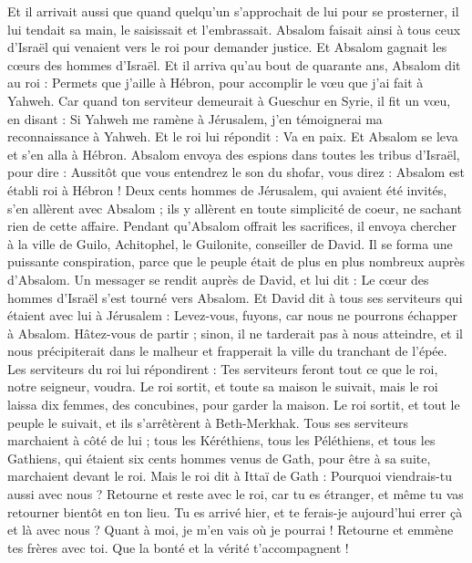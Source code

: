 \begin{multicols}{2}
Et il arrivait aussi que quand quelqu'un s'approchait de lui pour se prosterner, il lui tendait sa main, le saisissait et l'embrassait.
Absalom faisait ainsi à tous ceux d'Israël qui venaient vers le roi pour demander justice. Et Absalom gagnait les cœurs des hommes d'Israël.
Et il arriva qu'au bout de quarante ans, Absalom dit au roi : Permets que j'aille à Hébron, pour accomplir le vœu que j'ai fait à Yahweh.
Car quand ton serviteur demeurait à Gueschur en Syrie, il fit un vœu, en disant : Si Yahweh me ramène à Jérusalem, j'en témoignerai ma reconnaissance à Yahweh.
Et le roi lui répondit : Va en paix. Et Absalom se leva et s'en alla à Hébron.
Absalom envoya des espions dans toutes les tribus d'Israël, pour dire : Aussitôt que vous entendrez le son du shofar, vous direz : Absalom est établi roi à Hébron !
Deux cents hommes de Jérusalem, qui avaient été invités, s'en allèrent avec Absalom ; ils y allèrent en toute simplicité de coeur, ne sachant rien de cette affaire.
Pendant qu'Absalom offrait les sacrifices, il envoya chercher à la ville de Guilo, Achitophel, le Guilonite, conseiller de David. Il se forma une puissante conspiration, parce que le peuple était de plus en plus nombreux auprès d'Absalom.
Un messager se rendit auprès de David, et lui dit : Le cœur des hommes d'Israël s'est tourné vers Absalom.
Et David dit à tous ses serviteurs qui étaient avec lui à Jérusalem : Levez-vous, fuyons, car nous ne pourrons échapper à Absalom. Hâtez-vous de partir ; sinon, il ne tarderait pas à nous atteindre, et il nous précipiterait dans le malheur et frapperait la ville du tranchant de l'épée.
Les serviteurs du roi lui répondirent : Tes serviteurs feront tout ce que le roi, notre seigneur, voudra.
Le roi sortit, et toute sa maison le suivait, mais le roi laissa dix femmes, des concubines, pour garder la maison.
Le roi sortit, et tout le peuple le suivait, et ils s'arrêtèrent à Beth-Merkhak.
Tous ses serviteurs marchaient à côté de lui ; tous les Kéréthiens, tous les Péléthiens, et tous les Gathiens, qui étaient six cents hommes venus de Gath, pour être à sa suite, marchaient devant le roi.
Mais le roi dit à Ittaï de Gath : Pourquoi viendrais-tu aussi avec nous ? Retourne et reste avec le roi, car tu es étranger, et même tu vas retourner bientôt en ton lieu.
Tu es arrivé hier, et te ferais-je aujourd'hui errer çà et là avec nous ? Quant à moi, je m'en vais où je pourrai ! Retourne et emmène tes frères avec toi. Que la bonté et la vérité t'accompagnent !

\end{multicols}
